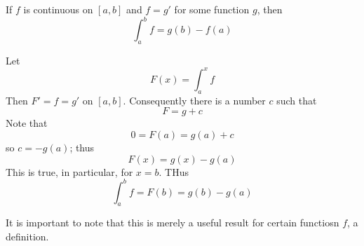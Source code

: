 \documentclass[12pt]{report}
\begin{document}
\begin{cor}{}{}
    If $f$ is continuous on $[a,b]$ and $f = g'$ for some function $g$, then \begin{equation}
        \int_a^bf = g(b) - f(a)
    \end{equation}
\end{cor}
\begin{proof*}{}{}
    Let \begin{equation*}
        F(x) = \int_a^xf
    \end{equation*}
    Then $F' = f = g'$ on $[a,b]$. Consequently there is a number $c$ such that \begin{equation*}
        F = g+c
    \end{equation*}
    Note that $$0 = F(a) = g(a) + c$$ so $c = -g(a)$; thus \begin{equation*}
        F(x) = g(x) - g(a)
    \end{equation*}
    This is true, in particular, for $x = b$. THus \begin{equation*}
        \int_a^bf = F(b) = g(b) - g(a)
    \end{equation*}
\end{proof*}

\begin{rmk}{}{}
    It is important to note that this is merely a useful result for certain functiosn $f$,  a definition.
\end{rmk}
\end{document}
